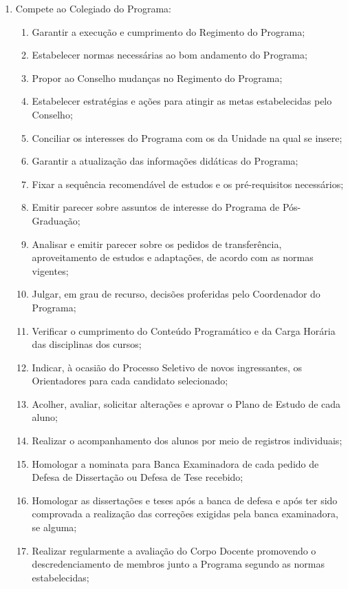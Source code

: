 \documentclass{article}
\newcommand{\grupoMenor}{Colegiado\xspace}
\newcommand{\grupoMaior}{Conselho\xspace}
\begin{document}
\begin{enumerate}
	\item Compete ao \grupoMenor do Programa:
	\begin{enumerate}[label=\Roman*]
		\item Garantir a execução e cumprimento do Regimento do Programa;
		\item Estabelecer normas necessárias ao bom andamento do Programa;
		\item Propor ao \grupoMaior mudanças no Regimento do Programa;
		\item Estabelecer estratégias e ações para atingir as metas estabelecidas pelo \grupoMaior;
		\item Conciliar os interesses do Programa com os da Unidade na qual se insere;
		\item Garantir a atualização das informações didáticas do Programa;
		\item Fixar a sequência recomendável de estudos e os pré-requisitos necessários;
		\item Emitir parecer sobre assuntos de interesse do Programa de Pós-Graduação;
		\item Analisar e emitir parecer sobre os pedidos de transferência, aproveitamento de estudos e adaptações, de acordo com as normas vigentes;
		\item Julgar, em grau de recurso, decisões proferidas pelo Coordenador do Programa;
		\item Verificar o cumprimento do Conteúdo Programático e da Carga Horária das disciplinas dos cursos;
		\item Indicar, à ocasião do Processo Seletivo de novos ingressantes, os Orientadores para cada candidato selecionado;	
		\item Acolher, avaliar, solicitar alterações e aprovar o Plano de Estudo de cada aluno;
		\item Realizar o acompanhamento dos alunos por meio de registros individuais;
		\item Homologar a nominata para Banca Examinadora de cada pedido de Defesa de Dissertação ou Defesa de Tese recebido;
		\item Homologar as dissertações e teses após a banca de defesa e após ter sido comprovada a realização das correções exigidas pela banca examinadora, se alguma;
		\item Realizar regularmente a avaliação do Corpo Docente promovendo o descredenciamento de membros junto a Programa segundo as normas estabelecidas;

\end{enumerate}
\end{enumerate}
\end{document}
